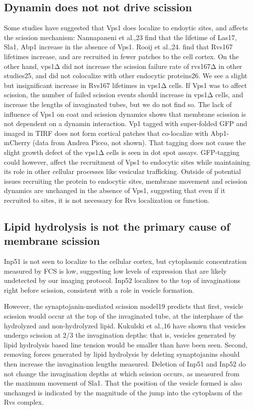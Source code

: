\subsection{Dynamin does not not drive scission}
Some studies have suggested that Vps1 does localize to endoytic sites, and affects the scission mechanism: Nannapaneni et al.,23 find that the lifetime of Las17, Sla1, Abp1 increase in the absence of Vps1. Rooij et al.,24. find that Rvs167 lifetimes increase, and are recruited in fewer patches to the cell cortex. On the other hand, vps1Δ did not increase the scission failure rate of rvs167Δ in other studies25, and did not colocalize with other endocytic proteins26. We see a slight but insignificant increase in Rvs167 lifetimes in vps1Δ cells. If Vps1 was to affect scission, the number of failed scission events should increase in vps1Δ cells, and increase the lengths of invaginated tubes, but we do not find so. The lack of influence of Vps1 on coat and scission dynamics shows that membrane scission is not dependent on a dynamin interaction. Vp1 tagged with super-folded GFP and imaged in TIRF does not form cortical patches that co-localize with Abp1-mCherry (data from Andrea Picco, not shown). That tagging does not cause the slight growth defect of the vps1Δ cells is seen in dot spot assays. GFP-tagging could however, affect the recruitment of Vps1 to endocytic sites while maintaining its role in other cellular processes like vesicular trafficking. Outside of potential issues recruiting the protein to endocytic sites, membrane movement and scission dynamics are unchanged in the absence of Vps1, suggesting that even if it recruited to sites, it is not necessary for Rvs localization or function. 


\subsection{Lipid hydrolysis is not the primary cause of membrane scission}
Inp51 is not seen to localize to the cellular cortex, but cytoplasmic concentration measured by FCS is low, suggesting low levels of expression that are likely undetected by our imaging protocol. Inp52 localizes to the top of invaginations right before scission, consistent with a role in vesicle formation. 

However, the synaptojanin-mediated scission model19 predicts that first, vesicle scission would occur at the top of the invaginated tube, at the interphase of the hydrolyzed and non-hydrolyzed lipid. Kukulski et al.,16 have shown that vesicles undergo scission at 2/3 the invagination depths: that is, vesicles generated by lipid hydrolysis based line tension would be smaller than have been seen. Second, removing forces generated by lipid hydrolysis by deleting synaptojanins should then increase the invagination lengths measured. Deletion of Inp51 and Inp52 do not change the invagination depths at which scission occurs, as measured from the maximum movement of Sla1. That the position of the vesicle formed is also unchanged is indicated by the magnitude of the jump into the cytoplasm of the Rvs complex. 

